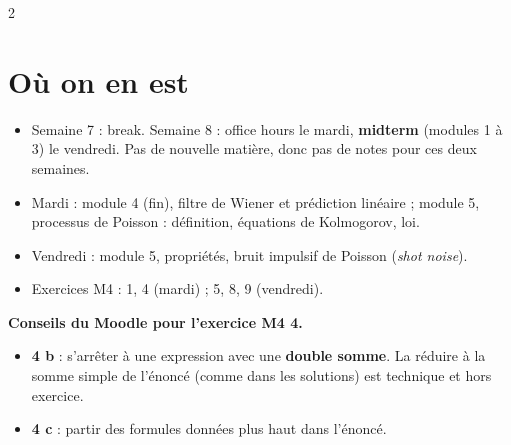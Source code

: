 \documentclass[a4paper,9pt]{extarticle}
\begin{document}

\thispagestyle{fancy}



\begin{multicols}{2}


\section{Où on en est}


\begin{summary}

\begin{itemize}

\item Semaine 7 : break. Semaine 8 : office hours le mardi, \textbf{midterm} (modules 1 à 3)
le vendredi. Pas de nouvelle matière, donc pas de notes pour ces deux semaines.

\item Mardi : module 4 (fin), filtre de Wiener et prédiction linéaire ; module 5, processus de
Poisson : définition, équations de Kolmogorov, loi.

\item Vendredi : module 5, propriétés, bruit impulsif de Poisson (\emph{shot noise}).

\item Exercices M4 : 1, 4 (mardi) ; 5, 8, 9 (vendredi).

\end{itemize}

\end{summary}


\begin{important}

\textbf{Conseils du Moodle pour l'exercice M4 4.}

\begin{itemize}

\item \textbf{4 b} : s'arrêter à une expression avec une \textbf{double somme}. La réduire à la
somme simple de l'énoncé (comme dans les solutions) est technique et hors exercice.

\item \textbf{4 c} : partir des formules données plus haut dans l'énoncé.

\end{itemize}

\end{important}



\end{multicols}
\end{document}
